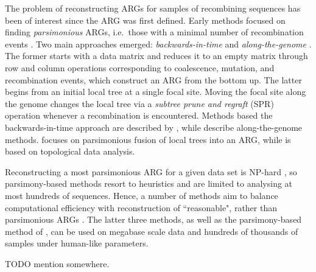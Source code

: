 \documentclass{article}
\begin{document}
The problem of reconstructing ARGs for samples of recombining sequences has been of
interest since the ARG was first defined. Early methods focused on finding \emph{parsimonious} ARGs,
i.e.\ those with a minimal number of recombination events \citep{hein1990reconstructing}.
Two main approaches emerged: \emph{backwards-in-time} \citep{lyngso2005minimum} and
\emph{along-the-genome} \citep{song2003parsimonious, song2005constructing}.
The former starts with a data matrix and reduces it to an empty matrix through row and column operations
corresponding to coalescence, mutation, and recombination events, which construct
an ARG from the bottom up. The latter begins from an initial local tree at a single focal site. Moving the
focal site along the genome changes the local tree via a \emph{subtree prune and regraft} (SPR) operation
whenever a recombination is encountered. Methods based the backwards-in-time approach are described by
\citet{song2005efficient, wu2008association, thao2019hybrid, ignatieva2021kwarg},
while \citet{hein1993heuristic, wu2011new, mirzaei2017rent} describe along-the-genome methods.
\citet{rasmussen2022espalier} focuses on parsimonious fusion of local trees into an ARG, while
\citet{camara2016inference} is based on topological data analysis.

Reconstructing a most parsimonious ARG for a given data set is NP-hard \citep{wang2001perfect},
so parsimony-based methods resort to heuristics and are limited to analysing at most hundreds of sequences.
Hence, a number of methods aim to balance computational efficiency with reconstruction of ``reasonable",
rather than parsimonious ARGs
\citep{minichiello2006mapping, parida2008estimating, kelleher2019inferring,  speidel2019method, zhang2021biobank}.
The latter three methods, as well as the parsimony-based method of \citet{rasmussen2022espalier},
can be used on megabase scale data and hundreds of thousands of samples under human-like parameters.

TODO mention \citep{schaefer2021ancestral} somewhere.

\end{document}
